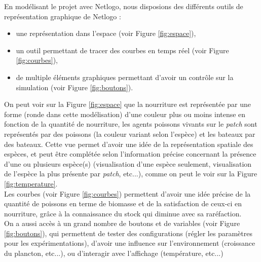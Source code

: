 En modélisant le projet avec Netlogo, nous disposions des différents outils de représentation graphique de Netlogo :
\begin{itemize}
\item{une représentation dans l'espace (voir Figure \ref{fig:espace}),}
\item{un outil permettant de tracer des courbes en temps réel (voir Figure \ref{fig:courbes}),}
\item{de multiple éléments graphiques permettant d'avoir un contrôle sur la simulation (voir Figure \ref{fig:boutons}).}
\end{itemize}
On peut voir sur la Figure \ref{fig:espace} que la nourriture est représentée par une forme (ronde dans cette modélisation) d'une couleur plus ou moins intense en fonction de la quantité de nourriture, les agents poissons vivants sur le \textit{patch} sont représentés par des poissons (la couleur variant selon l'espèce) et les bateaux par des bateaux. Cette vue permet d'avoir une idée de la représentation spatiale des espèces, et peut être complétée selon l'information précise concernant la présence d'une ou plusieurs espèce(s) (visualisation d'une espèce seulement, visualisation de l'espèce la plus présente par \textit{patch}, etc...), comme on peut le voir sur la Figure \ref{fig:temperature}.
\\
Les courbes (voir Figure \ref{fig:courbes}) permettent d'avoir une idée précise de la quantité de poissons en terme de biomasse et de la satisfaction de ceux-ci en nourriture, grâce à la connaissance du stock qui diminue avec sa raréfaction.
\\
On a aussi accès à un grand nombre de boutons et de variables (voir Figure \ref{fig:boutons}), qui permettent de tester des configurations (régler les paramètres pour les expérimentations), d'avoir une influence sur l'environnement (croissance du plancton, etc...), ou d'interagir avec l'affichage (température, etc...)


